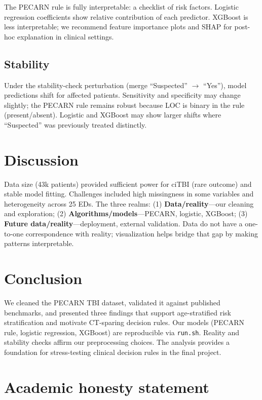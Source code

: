 \documentclass[10pt,letterpaper]{article}
\begin{document}
The PECARN rule is fully interpretable: a checklist of risk factors. Logistic regression coefficients show relative contribution of each predictor. XGBoost is less interpretable; we recommend feature importance plots and SHAP for post-hoc explanation in clinical settings.

\subsection{Stability}

Under the stability-check perturbation (merge ``Suspected'' $\to$ ``Yes''), model predictions shift for affected patients. Sensitivity and specificity may change slightly; the PECARN rule remains robust because LOC is binary in the rule (present/absent). Logistic and XGBoost may show larger shifts where ``Suspected'' was previously treated distinctly.

\section{Discussion}\label{discussion}

Data size (43k patients) provided sufficient power for ciTBI (rare outcome) and stable model fitting. Challenges included high missingness in some variables and heterogeneity across 25 EDs. The three realms: (1) \textbf{Data/reality}---our cleaning and exploration; (2) \textbf{Algorithms/models}---PECARN, logistic, XGBoost; (3) \textbf{Future data/reality}---deployment, external validation. Data do not have a one-to-one correspondence with reality; visualization helps bridge that gap by making patterns interpretable.

\section{Conclusion}\label{conclusion}

We cleaned the PECARN TBI dataset, validated it against published benchmarks, and presented three findings that support age-stratified risk stratification and motivate CT-sparing decision rules. Our models (PECARN rule, logistic regression, XGBoost) are reproducible via \texttt{run.sh}. Reality and stability checks affirm our preprocessing choices. The analysis provides a foundation for stress-testing clinical decision rules in the final project.

\section{Academic honesty statement}\label{academic-honesty-statement}
\end{document}
